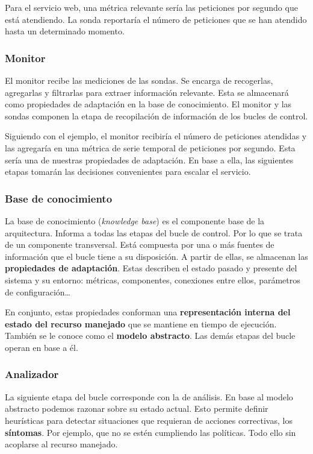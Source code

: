 Para el servicio web, una métrica relevante sería las peticiones por segundo que está atendiendo. La sonda reportaría el número de peticiones que se han atendido hasta un determinado momento.

\subsubsection{Monitor}

El monitor recibe las mediciones de las sondas. Se encarga de recogerlas, agregarlas y filtrarlas para extraer información relevante. Esta se almacenará como propiedades de adaptación en la base de conocimiento.\cite{fonsEspecificacionSistemasAutoadaptativos2021} El monitor y las sondas componen la etapa de recopilación de información de los bucles de control.

Siguiendo con el ejemplo, el monitor recibiría el número de peticiones atendidas y las agregaría en una métrica de serie temporal de peticiones por segundo. Esta sería una de nuestras propiedades de adaptación. En base a ella, las siguientes etapas tomarán las decisiones convenientes para escalar el servicio.

\subsubsection{Base de conocimiento}

La base de conocimiento (\emph{knowledge base}) es el componente base de la arquitectura. Informa a todas las etapas del bucle de control. Por lo que se trata de un componente transversal. Está compuesta por una o más fuentes de información que el bucle tiene a su disposición. A partir de ellas, se almacenan las \textbf{propiedades de adaptación}. Estas describen el estado pasado y presente del sistema y su entorno: métricas, componentes, conexiones entre ellos, parámetros de configuración\dots

En conjunto, estas propiedades conforman una \textbf{representación interna del estado del recurso manejado} que se mantiene en tiempo de ejecución. También se le conoce como el \textbf{modelo abstracto}. \cite{garlanIncreasingSystemDependability2003} Las demás etapas del bucle operan en base a él.

\subsubsection{Analizador}

La siguiente etapa del bucle corresponde con la de análisis. En base al modelo abstracto podemos razonar sobre su estado actual. Esto permite definir heurísticas para detectar situaciones que requieran de acciones correctivas, los \textbf{síntomas}. \cite{brunEngineeringSelfAdaptiveSystems2009} Por ejemplo, que no se estén cumpliendo las políticas. Todo ello sin acoplarse al recurso manejado.

